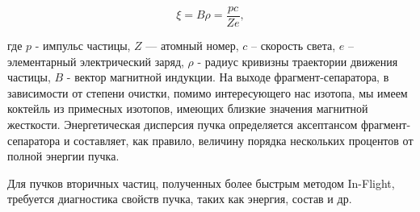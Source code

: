 \begin{equation}
\label{Mag}
\xi = B \rho =  \frac{pc}{Ze},
\end{equation}

где $p$ - импульс частицы, $Z$ — атомный номер, $c$ – скорость света, $e$ – элементарный электрический заряд, $\rho$ - радиус кривизны траектории движения частицы, $B$ - вектор магнитной индукции.  На выходе фрагмент-сепаратора, в зависимости от степени очистки, помимо интересующего нас изотопа, мы имеем коктейль из примесных изотопов, имеющих близкие значения магнитной жесткости. Энергетическая дисперсия пучка определяется аксептансом фрагмент-сепаратора и составляет, как правило, величину порядка нескольких процентов от полной энергии пучка. 


%
%
%
Для пучков вторичных частиц, полученных более быстрым методом In-Flight, требуется диагностика свойств пучка, таких как энергия, состав и др.



